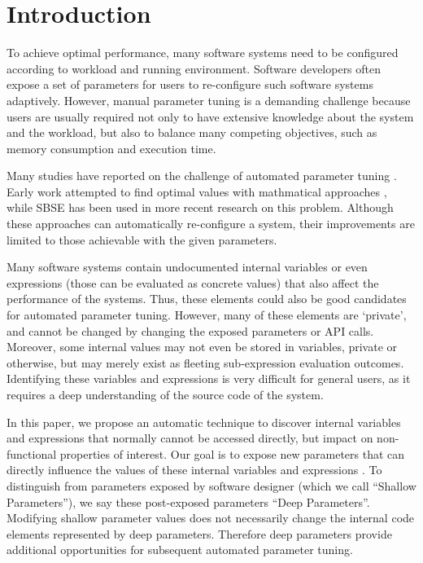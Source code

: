 
\section{Introduction}

To achieve optimal performance, many software systems need to be configured according to workload and running environment. 
Software developers often expose a set of parameters for users to re-configure such software systems adaptively.
However, manual parameter tuning is a demanding challenge because users are usually required not only to have extensive knowledge about the system and the workload, but also to balance many competing objectives, such as memory consumption and execution time.

Many studies have reported on the challenge of automated parameter tuning \cite{Hoffmann:2011:DKR:1950365.1950390, Vuduc01statisticalmodels,autotuning,Whaley:1998:ATL:509058.509096,Tapus:2002:AHT:762761.762771, hutter2009paramils,arcuri-ssbse-2011}. Early work attempted to find optimal values with mathmatical approaches \cite{Vuduc01statisticalmodels,autotuning,Whaley:1998:ATL:509058.509096,Tapus:2002:AHT:762761.762771}, while SBSE \cite{Harman:2007:CSF:1253532.1254729} has been used in more recent research \cite{hutter2009paramils,arcuri-ssbse-2011, Hoffmann:2011:DKR:1950365.1950390} on this problem. Although these approaches can automatically re-configure a system, their improvements are limited to those achievable with the given parameters.


Many software systems contain undocumented internal variables or even expressions (those can be evaluated as concrete values) that also affect the performance of the systems. Thus, these elements could also be good candidates for automated parameter tuning. However, many of these elements are `private', and cannot be changed by changing the exposed parameters or API calls. Moreover, some internal values may not even be stored in variables, private or otherwise, but may merely exist as fleeting sub-expression evaluation outcomes. Identifying these variables and expressions is very difficult for general users, as it requires a deep understanding of the source code of the system. 


In this paper, we propose an automatic technique to discover internal variables and expressions that normally cannot be accessed directly, but impact on non-functional properties of interest. Our goal is to expose new parameters that can directly influence the values of these internal variables and expressions \cite{Harman:2014:GIA:2593929.2600116}. To distinguish from parameters exposed by software designer (which we call ``Shallow Parameters''), we say these post-exposed parameters ``Deep Parameters''. Modifying shallow parameter values does not necessarily change the internal code elements represented by deep parameters. Therefore deep parameters provide additional opportunities for subsequent automated parameter tuning.



